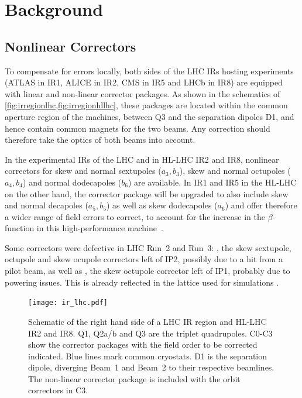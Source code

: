 \section{Background}

\subsection{Nonlinear Correctors}

To compensate for errors locally, both sides of the LHC IRs hosting experiments 
(ATLAS in IR1, ALICE in IR2, CMS in IR5 and LHCb in IR8) are equipped with linear and non-linear corrector packages.
As shown in the schematics of \cref{fig:irregionlhc,fig:irregionhllhc}, 
these packages are located within the common aperture region of the machines, between Q3 and the separation dipoles D1,
and hence contain common magnets for the two beams. 
Any correction should therefore take the optics of both beams into account.

In the experimental IRs of the LHC and in HL-LHC IR2 and IR8, nonlinear correctors for
skew and normal sextupoles ($a_3, b_3$), skew and normal octupoles ($a_4, b_4$) 
and normal dodecapoles ($b_6$) are available.
In IR1 and IR5 in the HL-LHC on the other hand, the corrector package will be upgraded to 
also include skew and normal decapoles ($a_5, b_5$) as well as skew dodecapoles ($a_6$)
and offer therefore a wider range of field errors to correct, to account for the 
increase in the $\beta$-function in this high-performance 
machine~\cite{BejarAlonsoHighLuminosityLargeHadron2020,DeMariaHighLuminosityLHC2019,BuffatOpticsMeasurementCorrection2022}.


Some correctors were defective in LHC Run~2 and Run~3:
, the skew sextupole, octupole and skew ocupole correctors left of IP2, possibly due to a hit from a pilot beam,
as well as , the skew octupole corrector left of IP1, probably due to powering issues. 
This is already reflected in the lattice used for simulations \cite{DeMariaCERNOpticsRepository}.


\begin{figure}[h!]
    \centering
    \texttt{[image: ir\_lhc.pdf]}
    \caption{Schematic of the right hand side of a LHC IR region and HL-LHC IR2 and IR8.
    Q1, Q2a/b and Q3 are the triplet quadrupoles.
    C0-C3 show the corrector packages with the field order to be corrected indicated. 
    Blue lines mark common cryostats. 
    D1 is the separation dipole, diverging Beam~1 and Beam~2
    to their respective beamlines. 
    The non-linear corrector package is included with the orbit correctors in C3.
    }
    \label{fig:irregionlhc}
\end{figure}


